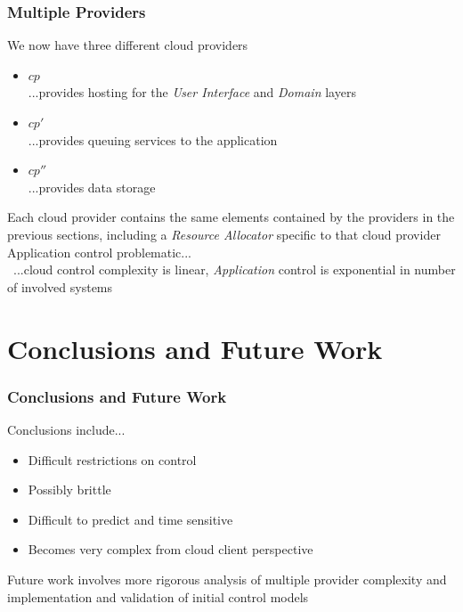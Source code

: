 \documentclass[t, 10pt]{beamer}
\begin{document}
\begin{frame}
\frametitle{Multiple Providers}
We now have three different cloud providers
\begin{itemize}
\item $ cp $ \\
...provides hosting for the \textit{User Interface} and \textit{Domain} layers 
\item $ cp' $ \\
...provides queuing services to the application
\item $ cp'' $ \\
...provides data storage
 \end{itemize}
 
Each cloud provider contains the same elements contained by the providers in the previous sections, including a \textit{Resource Allocator} specific to that cloud provider
\newline
\newline
Application control problematic...\\\
...cloud control complexity is linear, \textit{Application} control is exponential in number of involved systems
 
\end{frame}

\section{Conclusions and Future Work}
\begin{frame}
\frametitle{Conclusions and Future Work}
Conclusions include...
\begin{itemize}
\item Difficult restrictions on control
\item Possibly brittle
\item Difficult to predict and time sensitive
\item Becomes very complex from cloud client perspective
\end{itemize}
Future work involves more rigorous analysis of multiple provider complexity and implementation and validation of initial control models
\end{frame}

%
%
\end{document}
